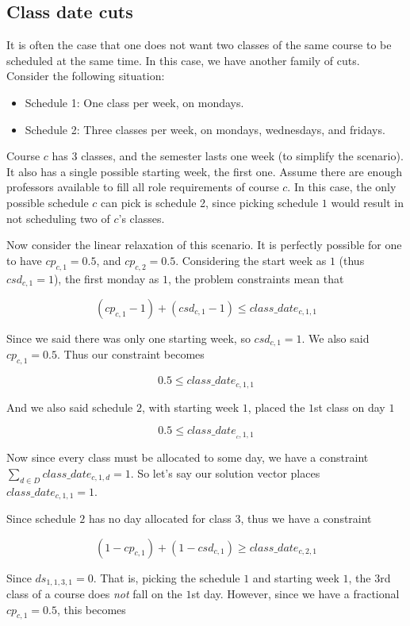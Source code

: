 \subsection{Class date cuts}

It is often the case that one does not want two classes of the same course to be scheduled at the same time. In this case, we have another family of cuts. Consider the following situation:

\begin{itemize}
  \item Schedule 1: One class per week, on mondays.
  \item Schedule 2: Three classes per week, on mondays, wednesdays, and fridays.
\end{itemize}

Course $c$ has 3 classes, and the semester lasts one week (to simplify the scenario). It also has a single possible starting week, the first one. Assume there are enough professors available to fill all role requirements of course $c$. In this case, the only possible schedule $c$ can pick is schedule 2, since picking schedule $1$ would result in not scheduling two of $c$'s classes.

Now consider the linear relaxation of this scenario. It is perfectly possible for one to have $cp_{c, 1} = 0.5$, and $cp_{c, 2} = 0.5$. Considering the start week as $1$ (thus $csd_{c, 1} = 1$), the first monday as $1$, the problem constraints mean that

$$
(cp_{c, 1} - 1) + (csd_{c, 1} - 1) \le class\_date_{c, 1, 1}
$$

Since we said there was only one starting week, so $csd_{c, 1} = 1$. We also said $cp_{c, 1} = 0.5$. Thus our constraint becomes

$$
0.5 \le class\_date_{c, 1, 1}
$$

And we also said schedule $2$, with starting week $1$,  placed the $1$st class on day $1$

$$
0.5 \le class\_date_{_c, 1, 1}
$$

Now since every class must be allocated to some day, we have a constraint $\sum_{d \in D} class\_date_{c, 1, d} = 1$. So let's say our solution vector places $class\_date_{c, 1, 1} = 1$.

Since schedule $2$ has no day allocated for class $3$, thus we have a constraint

$$
(1 - cp_{c, 1}) + (1 - csd_{c, 1}) \ge class\_date_{c, 2, 1}
$$

Since $ds_{1, 1, 3, 1} = 0$. That is, picking the schedule $1$ and starting week $1$, the $3$rd class of a course does \emph{not} fall on the $1$st day. However, since we have a fractional $cp_{c, 1} = 0.5$, this becomes

